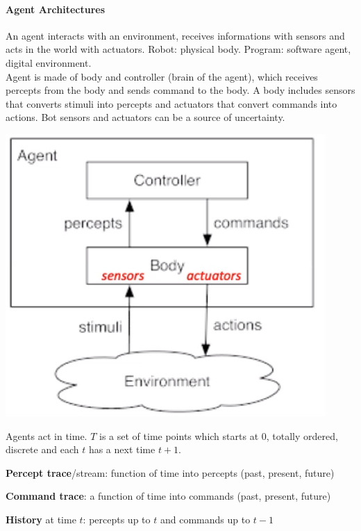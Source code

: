 \documentclass[10pt]{report}
\begin{document}
\paragraph{Agent Architectures} An agent interacts with an environment, receives informations with sensors and acts in the world with actuators. Robot: physical body. Program: software agent, digital environment.\\
Agent is made of body and controller (brain of the agent), which receives percepts from the body and sends command to the body. A body includes sensors that converts stimuli into percepts and actuators that convert commands into actions. Bot sensors and actuators can be a source of uncertainty.
\begin{center}
	\includegraphics[scale=0.5]{3.png}
\end{center}
Agents act in time. $T$ is a set of time points which starts at 0, totally ordered, discrete and each $t$ has a next time $t+1$.\begin{list}{}{}
	\item \textbf{Percept trace}/stream: function of time into percepts (past, present, future)
	\item \textbf{Command trace}: a function of time into commands (past, present, future)
	\item \textbf{History} at time $t$: percepts up to $t$ and commands up to $t-1$
\end{list}
\end{document}
